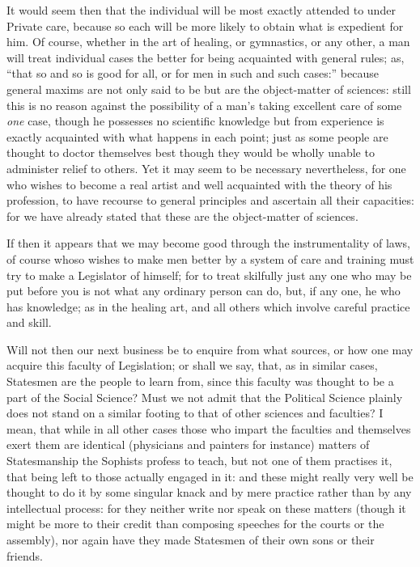 It would seem then that the individual will be most exactly attended to under
Private care, because so each will be more likely to obtain what is expedient
for him. Of course, whether in the art of healing, or gymnastics, or any other,
a man will treat individual cases the better for being acquainted with general
rules; as, “that so and so is good for all, or for men in such and such
cases:” because general maxims are not only said to be but are the
object-matter of sciences: still this is no reason against the possibility of a
man’s taking excellent care of some \emph{one} case, though he possesses
no scientific knowledge but from experience is exactly acquainted with what
happens in each point; just as some people are thought to doctor themselves
best though they would be wholly unable to administer relief to others. Yet it
may seem to be necessary nevertheless, for one who wishes to become a real
artist and well acquainted with the theory of his profession, to have recourse
to general principles and ascertain all their capacities: for we have already
stated that these are the object-matter of sciences.

If then it appears that we may become good through the instrumentality of laws,
of course whoso wishes to make men better by a system of care and training must
try to make a Legislator of himself; for to treat skilfully just any one who
may be put before you is not what any ordinary person can do, but, if any one,
he who has knowledge; as in the healing art, and all others which involve
careful practice and skill.

Will not then our next business be to enquire from what sources, or how one may
acquire this faculty of Legislation; or shall we say, that, as in similar
cases, Statesmen are the people to learn from, since this faculty was thought
to be a part of the Social Science? Must we not admit that the Political
Science plainly does not stand on a similar footing to that of other sciences
and faculties? I mean, that while in all other cases those who impart the
faculties and themselves exert them are identical (physicians and painters for
instance) matters of Statesmanship the Sophists profess to teach, but not one
of them practises it, that being left to those actually engaged in it: and
these might really very well be thought to do it by some singular knack and by
mere practice rather than by any intellectual process: for they neither write
nor speak on these matters (though it might be more to their credit than
composing speeches for the courts or the assembly), nor again have they made
Statesmen of their own sons or their friends.


